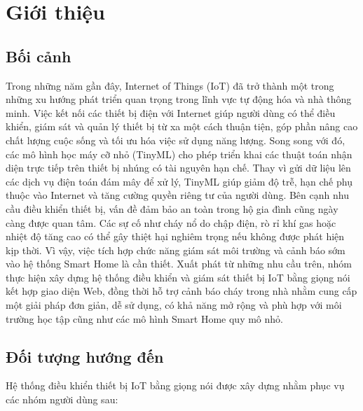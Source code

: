 \documentclass[a4paper,12pt]{article}
\begin{document}
\section{Giới thiệu}
\subsection{Bối cảnh} Trong những năm gần đây, Internet of Things (IoT) đã trở thành một trong những xu hướng phát triển quan trọng trong lĩnh vực tự động hóa và nhà thông minh. Việc kết nối các thiết bị điện với Internet giúp người dùng có thể điều khiển, giám sát và quản lý thiết bị từ xa một cách thuận tiện, góp phần nâng cao chất lượng cuộc sống và tối ưu hóa việc sử dụng năng lượng. Song song với đó, các mô hình học máy cỡ nhỏ (TinyML) cho phép triển khai các thuật toán nhận diện trực tiếp trên thiết bị nhúng có tài nguyên hạn chế. Thay vì gửi dữ liệu lên các dịch vụ điện toán đám mây để xử lý, TinyML giúp giảm độ trễ, hạn chế phụ thuộc vào Internet và tăng cường quyền riêng tư của người dùng. Bên cạnh nhu cầu điều khiển thiết bị, vấn đề đảm bảo an toàn trong hộ gia đình cũng ngày càng được quan tâm. Các sự cố như cháy nổ do chập điện, rò rỉ khí gas hoặc nhiệt độ tăng cao có thể gây thiệt hại nghiêm trọng nếu không được phát hiện kịp thời. Vì vậy, việc tích hợp chức năng giám sát môi trường và cảnh báo sớm vào hệ thống Smart Home là cần thiết. Xuất phát từ những nhu cầu trên, nhóm thực hiện xây dựng hệ thống điều khiển và giám sát thiết bị IoT bằng giọng nói kết hợp giao diện Web, đồng thời hỗ trợ cảnh báo cháy trong nhà nhằm cung cấp một giải pháp đơn giản, dễ sử dụng, có khả năng mở rộng và phù hợp với môi trường học tập cũng như các mô hình Smart Home quy mô nhỏ.
\subsection{Đối tượng hướng đến}

Hệ thống điều khiển thiết bị IoT bằng giọng nói được xây dựng nhằm phục vụ các nhóm người dùng sau:
\end{document}
